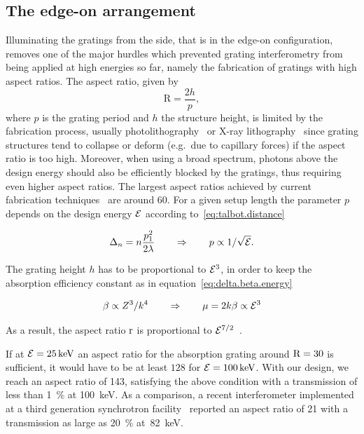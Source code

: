\subsection{The edge-on arrangement}\label{sec:edge-on-arrangement}
Illuminating the gratings from the side, that is in the edge-on
configuration, removes one of the major hurdles which prevented grating interferometry from
being applied at high energies so far, namely the fabrication of gratings
with high aspect ratios. The aspect ratio, given by
\begin{equation}
    \text{R} = \frac{2h}{p},
\end{equation}
where $p$ is the
grating period and $h$ the  structure height, is limited by the
fabrication process, usually photolithography~\cite{David2002} or X-ray
lithography~\cite{Mohr2012} since grating structures tend to collapse or deform
(e.g.\ due to capillary forces) if the aspect ratio is too high.
Moreover, when using a broad spectrum, photons above the design energy
should also be efficiently blocked by the gratings, thus requiring even
higher aspect ratios. The largest aspect ratios achieved by current
fabrication techniques~\cite{David2007,Kenntner2010} are around 60.
For a given setup length the parameter $p$ depends on the design energy
$\mathcal{E}$ according to~\eqref{eq:talbot.distance}

\begin{equation}
    \Delta_n = n \frac{p_1^2}{2 \lambda} \qquad \Rightarrow \qquad p \propto 1/\sqrt{\mathcal{E}}.\label{eq:period.energy}
\end{equation}

The grating height $h$ has to be proportional to $\mathcal{E}^3$, in order to
keep the absorption efficiency constant as in
equation~\eqref{eq:delta.beta.energy}

\begin{equation}
    \beta \propto Z^3 / k^4 \qquad \Rightarrow \qquad \mu = 2k\beta \propto
    \mathcal{E}^3
    \label{eq:absorption.energy}
\end{equation}

As a result, the aspect ratio $\textnormal{r}$ is proportional to $\mathcal{E}^{7/2}$~\cite{Momose2003a}.

If at $\mathcal{E}=\SI{25}{\kilo\electronvolt}$ an aspect ratio for the
absorption grating around $\textnormal{R}=30$ is sufficient, it would have
to be at least $\num{128}$ for $\energy=\SI{100}{\kilo\eV}$. With our
design, we reach an aspect ratio of \num{143}, satisfying the above
condition with a transmission of less than \SI{1}{\percent} at
\SI{100}{\kilo\eV}. As a comparison, a recent interferometer implemented at
a third generation synchrotron facility~\cite{Willner2013} reported an
aspect ratio of \num{21} with a transmission as large as \SI{20}{\percent}
at~\SI{82}{\kilo\eV}.

